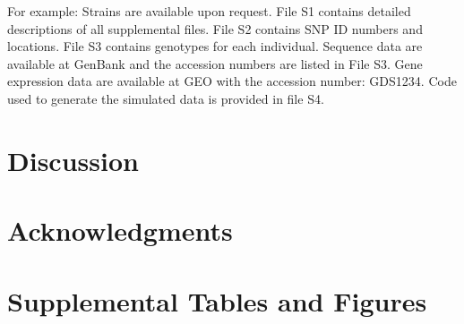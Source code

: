 \documentclass[9pt,twocolumn,twoside,lineno]{gsajnl}
\begin{document}
For example: Strains are available upon request. File S1 contains detailed descriptions of all supplemental files. File S2 contains SNP ID numbers and locations. File S3 contains genotypes for each individual. Sequence data are available at GenBank and the accession numbers are listed in File S3. Gene expression data are available at GEO with the accession number: GDS1234. Code used to generate the simulated data is provided in file S4. 


\section{Discussion}
\label{sec:discusion}

\section{Acknowledgments}
\label{sec:acknowledgments}



\pagebreak

\section*{Supplemental Tables and Figures}

\renewcommand{\thefigure}{S\arabic{figure}}
\linenumbers

\setcounter{figure}{0}
\end{document}
